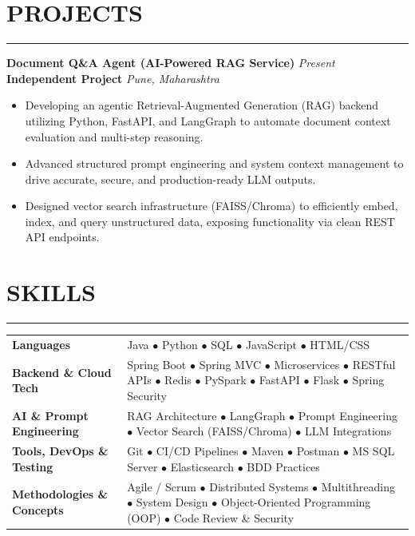 \documentclass[11pt,letterpaper]{article}
\newcommand{\sectionrule}{\vspace{-6pt}\hrule\vspace{3pt}}
\newcommand{\entryHeader}[4]{%
  \textbf{#1} \hfill \textit{#2}\\
  \textbf{#3} \hfill \textit{#4}
}
\newenvironment{entryList}{%
  \begin{itemize}[leftmargin=1.3em, itemsep=1.5pt, topsep=2pt, parsep=0pt]
}{%
  \end{itemize}\vspace{2pt}
}
\begin{document}
\section*{PROJECTS}
\sectionrule

\entryHeader{Document Q\&A Agent (AI-Powered RAG Service)}{Present}{Independent Project}{Pune, Maharashtra}
\begin{entryList}
  \item Developing an agentic Retrieval-Augmented Generation (RAG) backend utilizing Python, FastAPI, and LangGraph to automate document context evaluation and multi-step reasoning.
  \item Advanced structured prompt engineering and system context management to drive accurate, secure, and production-ready LLM outputs.
  \item Designed vector search infrastructure (FAISS/Chroma) to efficiently embed, index, and query unstructured data, exposing functionality via clean REST API endpoints.
\end{entryList}

\section*{SKILLS}
\sectionrule
\begin{tabularx}{\textwidth}{@{}p{1.95in}X@{}}
\textbf{Languages} & Java $\bullet$ Python $\bullet$ SQL $\bullet$ JavaScript $\bullet$ HTML/CSS \\[2pt]
\textbf{Backend \& Cloud Tech} & Spring Boot $\bullet$ Spring MVC $\bullet$ Microservices $\bullet$ RESTful APIs $\bullet$ Redis $\bullet$ PySpark $\bullet$ FastAPI $\bullet$ Flask $\bullet$ Spring Security \\[2pt]
\textbf{AI \& Prompt Engineering} & RAG Architecture $\bullet$ LangGraph $\bullet$ Prompt Engineering $\bullet$ Vector Search (FAISS/Chroma) $\bullet$ LLM Integrations \\[2pt]
\textbf{Tools, DevOps \& Testing} & Git $\bullet$ CI/CD Pipelines $\bullet$ Maven $\bullet$ Postman $\bullet$ MS SQL Server $\bullet$ Elasticsearch $\bullet$ BDD Practices \\[2pt]
\textbf{Methodologies \& Concepts} & Agile / Scrum $\bullet$ Distributed Systems $\bullet$ Multithreading $\bullet$ System Design $\bullet$ Object-Oriented Programming (OOP) $\bullet$ Code Review \& Security \\
\end{tabularx}
\end{document}
